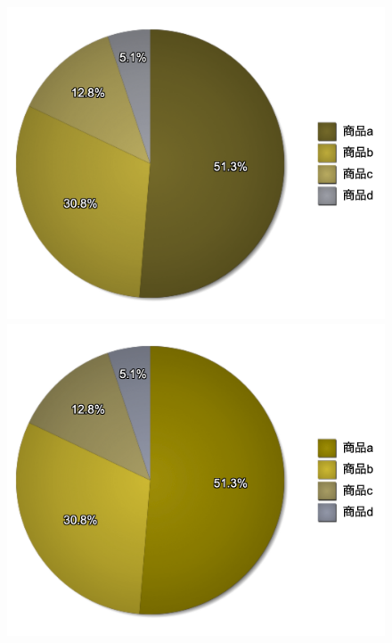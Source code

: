 \begin{figure}[H]
\begin{minipage}[b]{.49\textwidth}
    \end{minipage}
    \begin{minipage}[b]{.30\textwidth}
        \centering
        \includegraphics[keepaspectratio,width=\textwidth]{../../10_UniversalDesign/no2_circle_CC_P.png}
    \end{minipage}
    \begin{minipage}[b]{.30\textwidth}
        \centering
        \includegraphics[keepaspectratio,width=\textwidth]{../../10_UniversalDesign/no2_circle_CC_D.png}

\end{minipage}
\end{figure}
